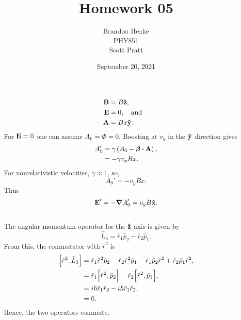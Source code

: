 \documentclass[a4paper,12pt,twoside]{article}
\title{Homework 05}
\author{Brandon Henke\\PHY851\\Scott Pratt}
\date{September 20, 2021}
\begin{document}

\maketitle

\setcounter{subsection}{4}
\subsection{}%
\begin{align}
	\vb{B} &= B\vu{z},\\
	\vb{E} &= 0, \qq{and}\\
	\vb{A} &= Bx\vu{y}.
\end{align}
For $\vb{E} = 0$ one can assume $A_0 = \Phi = 0$.
Boosting at $v_y$ in the $\vu{y}$ direction gives
\begin{align}
	A_0' &= \gamma\left(A_0 - \bm{\beta}\vdot\vb{A}\right),\\
	&= - \gamma v_y B x.
\end{align}
For nonrelativistic velocities, $\gamma \approx 1$, so,
\begin{equation}
	A_0' = -v_y Bx.
\end{equation}
Thus
\begin{equation}
	\vb{E}' = -\grad{A_0'} = v_y B \vu{x}.
\end{equation}

\setcounter{section}{4}
\setcounter{subsection}{0}
\subsection{}%
The angular momentum operator for the $\vu{z}$ axis is given by
\begin{equation}
	\hat{L}_3 = \hat{r}_1\hat{p}_2-\hat{r}_2 \hat{p}_1.
\end{equation}
From this, the commutator with $\hat{r}^2$ is
\begin{align}
	\comm{\hat{r}^2}{\hat{L}_3}
	&= \hat{r}_1\hat{r}^2\hat{p}_2 - \hat{r}_2\hat{r}^2\hat{p}_1 - \hat{r}_1\hat{p}_2\hat{r}^2 + \hat{r}_2\hat{p}_1\hat{r}^2,\\
	&= \hat{r}_1\comm{\hat{r}^2}{\hat{p}_2}-\hat{r}_2\comm{\hat{r}^2}{\hat{p}_1},\\
	&= i\hbar \hat{r}_1\hat{r}_2 - i\hbar\hat{r}_1\hat{r}_2,\\
	&= 0.
\end{align}
Hence, the two operators commute.
\end{document}
